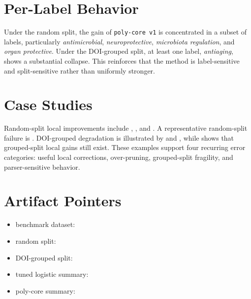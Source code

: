\documentclass{article}
\begin{document}
\section{Per-Label Behavior}

Under the random split, the gain of \texttt{poly-core v1} is concentrated in a subset of labels, particularly \textit{antimicrobial}, \textit{neuroprotective}, \textit{microbiota regulation}, and \textit{organ protective}. Under the DOI-grouped split, at least one label, \textit{antiaging}, shows a substantial collapse. This reinforces that the method is label-sensitive and split-sensitive rather than uniformly stronger.

\section{Case Studies}

Random-split local improvements include , , and . A representative random-split failure is . DOI-grouped degradation is illustrated by  and , while  shows that grouped-split local gains still exist. These examples support four recurring error categories: useful local corrections, over-pruning, grouped-split fragility, and parser-sensitive behavior.

\section{Artifact Pointers}

\begin{itemize}
\item benchmark dataset: 
\item random split: 
\item DOI-grouped split: 
\item tuned logistic summary: 
\item poly-core summary: 
\end{itemize}
\end{document}
